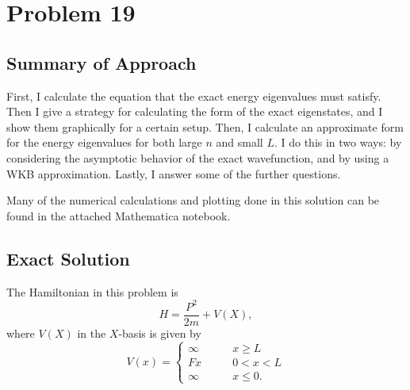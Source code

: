 \documentclass[12pt]{article}
\title{}
\date{}
\author{Jacob H. Nie}
\begin{document}
\section*{Problem 19}

\subsection*{Summary of Approach}
First, I calculate the equation that the exact energy eigenvalues must satisfy.  Then I give a strategy for calculating the form of the exact eigenstates, and I show them graphically for a certain setup.  Then, I calculate an approximate form for the energy eigenvalues for both large $n$ and small $L$.  I do this in two ways: by considering the asymptotic behavior of the exact wavefunction, and by using a WKB approximation.  Lastly, I answer some of the further questions.

Many of the numerical calculations and plotting done in this solution can be found in the attached Mathematica notebook.

\subsection*{Exact Solution}

The Hamiltonian in this problem is 
\[
	H = \frac{P^2}{2m} + V(X),
\] 
where $V(X)$ in the $X$-basis is given by
\[
	V(x) = 
	\begin{cases}
		\infty \qquad & x\geq L \\
		Fx \qquad & 0 < x < L \\
		\infty \qquad & x \leq 0.
	\end{cases}
\] 
\end{document}
